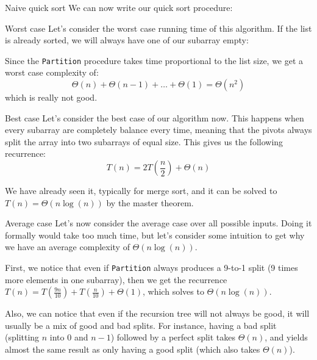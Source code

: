 \documentclass[a4paper]{article}
\begin{document}
\begin{parag}{Naive quick sort}
    We can now write our quick sort procedure:
    
    \begin{subparag}{Worst case}
        Let's consider the worst case running time of this algorithm. If the list is already sorted, we will always have one of our subarray empty:

        Since the \texttt{Partition} procedure takes time proportional to the list size, we get a worst case complexity of: 
        \[\Theta\left(n\right) + \Theta\left(n-1\right) + \ldots + \Theta\left(1\right) = \Theta\left(n^2\right)\]
        which is really not good.
    \end{subparag}
    
    \begin{subparag}{Best case}
        Let's consider the best case of our algorithm now. This happens when every subarray are completely balance every time, meaning that the pivots always split the array into two subarrays of equal size. This gives us the following recurrence: 
        \[T\left(n\right) = 2T\left(\frac{n}{2}\right) + \Theta\left(n\right)\]
        
        We have already seen it, typically for merge sort, and it can be solved to $T\left(n\right) = \Theta\left(n\log\left(n\right)\right)$ by the master theorem.
    \end{subparag}

    \begin{subparag}{Average case}
        Let's now consider the average case over all possible inputs. Doing it formally would take too much time, but let's consider some intuition to get why we have an average complexity of $\Theta\left(n \log\left(n\right)\right)$.

        First, we notice that even if \texttt{Partition} always produces a 9-to-1 split (9 times more elements in one subarray), then we get the recurrence $T\left(n\right) = T\left(\frac{9n}{10}\right) + T\left(\frac{n}{10}\right) + \Theta\left(1\right)$, which solves to $\Theta\left(n \log\left(n\right)\right)$.

        Also, we can notice that even if the recursion tree will not always be good, it will usually be a mix of good and bad splits. For instance, having a bad split (splitting $n$ into $0$ and $n-1$) followed by a perfect split takes $\Theta\left(n\right)$, and yields almost the same result as only having a good split (which also takes $\Theta\left(n\right)$).
    \end{subparag}
\end{parag}
\end{document}
